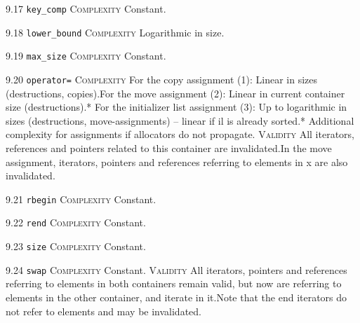 \noindent\textcolor{cgreen}{9.17 \texttt{key\_comp}} \textsc{Complexity} Constant. \vspace{0.5em}

\noindent\textcolor{clime}{9.18 \texttt{lower\_bound}} \textsc{Complexity} Logarithmic in size. \vspace{0.5em}

\noindent\textcolor{cgreen}{9.19 \texttt{max\_size}} \textsc{Complexity} Constant. \vspace{0.5em}

\noindent\textcolor{corange}{9.20 \texttt{operator=}} \textsc{Complexity} For the copy assignment (1): Linear in sizes (destructions, copies).For the move assignment (2): Linear in current container size (destructions).* For the initializer list assignment (3): Up to logarithmic in sizes (destructions, move-assignments) -- linear if il is already sorted.* Additional complexity for assignments if allocators do not propagate. \textsc{Validity} All iterators, references and pointers related to this container are invalidated.In the move assignment, iterators, pointers and references referring to elements in x are also invalidated.\vspace{0.5em}

\noindent\textcolor{cgreen}{9.21 \texttt{rbegin}} \textsc{Complexity} Constant. \vspace{0.5em}

\noindent\textcolor{cgreen}{9.22 \texttt{rend}} \textsc{Complexity} Constant. \vspace{0.5em}

\noindent\textcolor{cgreen}{9.23 \texttt{size}} \textsc{Complexity} Constant. \vspace{0.5em}

\noindent\textcolor{cgreen}{9.24 \texttt{swap}} \textsc{Complexity} Constant. \textsc{Validity} All iterators, pointers and references referring to elements in both containers remain valid, but now are referring to elements in the other container, and iterate in it.Note that the end iterators do not refer to elements and may be invalidated.\vspace{0.5em}

